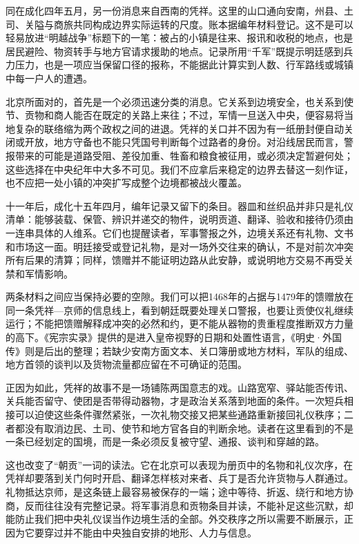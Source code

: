 同在成化四年五月，另一份消息来自西南的凭祥。这里的山口通向安南，州县、土司、关隘与商旅共同构成边界实际运转的尺度。账本据编年材料登记。这不是可以轻易放进“明越战争”标题下的一笔：被占的小镇是往来、报讯和收税的地点，也是居民避险、物资转手与地方官请求援助的地点。记录所用“千军”既提示明廷感到兵力压力，也是一项应当保留口径的报称，不能据此计算实到人数、行军路线或城镇中每一户人的遭遇。

北京所面对的，首先是一个必须迅速分类的消息。它关系到边境安全，也关系到使节、贡物和商人能否在既定的关路上来往；不过，军情一旦送入中央，便容易将当地复杂的联络缩为两个政权之间的进退。凭祥的关口并不因为有一纸册封便自动关闭或开放，地方守备也不能只凭国号判断每个过路者的身份。对沿线居民而言，警报带来的可能是道路受阻、差役加重、牲畜和粮食被征用，或必须决定暂避何处；这些选择在中央纪年中大多不可见。我们不应拿后来稳定的边界去替这一刻作证，也不应把一处小镇的冲突扩写成整个边境都被战火覆盖。

十一年后，成化十五年四月，编年记录又留下的条目。器皿和丝织品并非只是礼仪清单：能够装载、保管、辨识并递交的物件，说明贡道、翻译、验收和接待仍须由一连串具体的人维系。它们也提醒读者，军事警报之外，边境关系还有礼物、文书和市场这一面。明廷接受或登记礼物，是对一场外交往来的确认，不是对前次冲突所有后果的清算；同样，馈赠并不能证明边路从此安静，或说明地方交易不再受关禁和军情影响。

两条材料之间应当保持必要的空隙。我们可以把1468年的占据与1479年的馈赠放在同一条凭祥—京师的信息线上，看到朝廷既要处理关口警报，也要让贡使仪礼继续运行；不能把馈赠解释成冲突的必然和约，更不能从器物的贵重程度推断双方力量的高下。《宪宗实录》提供的是进入皇帝视野的日期和处置性语言，《明史·外国传》则是后出的整理；若缺少安南方面文本、关口簿册或地方材料，军队的组成、地方首领的谈判以及货物流量都应留在不可确证的范围。

正因为如此，凭祥的故事不是一场铺陈两国意志的戏。山路宽窄、驿站能否传讯、关兵能否留守、使团是否带得动器物，才是政治关系落到地面的条件。一次短兵相接可以迫使这些条件骤然紧张，一次礼物交接又把某些通路重新接回礼仪秩序；二者都没有取消边民、土司、使节和地方官各自的判断余地。读者在这里看到的不是一条已经划定的国境，而是一条必须反复被守望、通报、谈判和穿越的路。

这也改变了“朝贡”一词的读法。它在北京可以表现为册页中的名物和礼仪次序，在凭祥却要落到关门何时开启、翻译怎样核对来者、兵丁是否允许货物与人群通过。礼物抵达京师，是这条链上最容易被保存的一端；途中等待、折返、绕行和地方协商，反而往往没有完整记录。将军事消息和贡物条目并读，不能补足这些沉默，却能防止我们把中央礼仪误当作边境生活的全部。外交秩序之所以需要不断展示，正因为它要穿过并不能由中央独自安排的地形、人力与信息。


